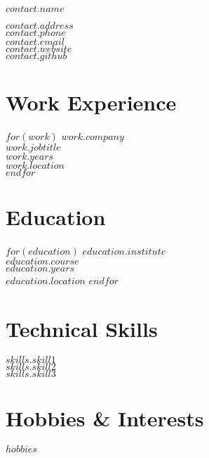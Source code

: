 \documentclass{cv-class}
\begin{document}
{\LARGE $contact.name$}\\
\smallskip

$contact.address$\\
$contact.phone$\\
$contact.email$\\
$contact.website$\\
$contact.github$

\section*{Work Experience}
$for(work)$
$work.company$\\
$work.jobtitle$\\
$work.years$\\
$work.location$\\
$endfor$

\section*{Education}
$for(education)$
$education.institute$\\
$education.course$\\
$education.years$\\
$education.location$
$endfor$

\section*{Technical Skills}
$skills.skill1$\\
$skills.skill2$\\
$skills.skill3$

\section*{Hobbies \& Interests}
$hobbies$
\end{document}
